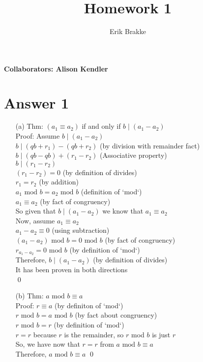 \documentclass[11pt]{article}
\providecommand{\myparab}[1]{\smallskip\noindent\textbf{#1} }
\theoremstyle{definition}
\begin{document}
\title{Homework 1}
\author{Erik Brakke}
\maketitle

\thispagestyle{fancy}

\myparab{Collaborators: Alison Kendler}
 
 
\section*{Answer 1}
\begin{enumerate}
	\item[(a)]
	Thm: $(a_1 \equiv a_2)$ if and only if $b \mid (a_1 - a_2)$\\
	Proof: Assume $b \mid (a_1 - a_2)$\\
	$b \mid (qb + r_1) - (qb + r_2)$ (by division with remainder fact)\\
	$b \mid (qb - qb) + (r_1 - r_2)$ (Associative property)\\
	$b \mid (r_1 - r_2)$\\
	$(r_1 - r_2) = 0$ (by definition of divides)\\
	$r_1 = r_2$ (by addition)\\
	$a_1 \text{ mod } b = a_2 \text{ mod } b$ (definition of `mod`)\\
	$a_1 \equiv a_2$ (by fact of congruency)\\
	So given that $b \mid (a_1 - a_2)$ we know that $a_1 \equiv a_2$\\
	\newline
	Now, assume $a_1 \equiv a_2$\\
	$a_1 - a_2 \equiv 0$ (using subtraction)\\
	$(a_1 - a_2) \text{ mod } b = 0 \text{ mod } b$ (by fact of congruency)\\
	$r_{a_1 - a_2} = 0 \text{ mod } b$ (by definition of `mod`)\\
	Therefore, $b \mid (a_1 - a_2)$ (by definition of divides)\\
	It has been proven in both directions\\
	\qed

	\item[(b)]
	Thm: $a \text{ mod } b \equiv a$\\
	Proof: $r \equiv a$ (by definiton of `mod`)\\
	$r \text{ mod } b = a \text{ mod } b$ (by fact about congruency)\\
	$r \text{ mod } b = r$ (by definition of `mod`)\\
	$r = r$ because $r$ is the remainder, so $r$ mod $b$ is just $r$\\
	So, we have now that $r = r$ from $a \text{ mod } b \equiv a$\\
	Therefore, $a \text{ mod } b \equiv a$ \qed


\end{enumerate}
\end{document}
